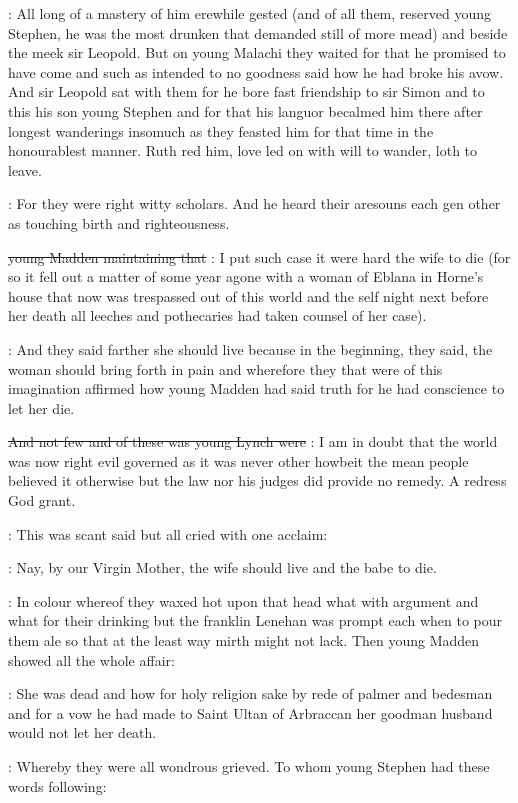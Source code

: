 \documentclass[12pt]{article}
\begin{document}
: All long of a mastery of him erewhile gested
(and of all them, reserved young Stephen, he was the most
drunken that demanded still of more mead) and beside the meek sir
Leopold. But on young Malachi they waited for that he promised to
have come and such as intended to no goodness said how he had broke
his avow. And sir Leopold sat with them for he bore fast friendship
to sir Simon and to this his son young Stephen and for that his languor
becalmed him there after longest wanderings insomuch as they feasted
him for that time in the honourablest manner. Ruth red him, love led
on with will to wander, loth to leave.


: For they were right witty scholars. And he heard their aresouns each
gen other as touching birth and righteousness.

\sout{young Madden maintaining that}
\Md: I put such case it were hard the wife to die (for so it fell out a
matter of some year agone with a woman of Eblana in Horne's house that
now was trespassed out of this world and the self night next before her
death all leeches and pothecaries had taken counsel of her case).

: And they said farther she should live because in the beginning, they
said, the woman should bring forth in pain and wherefore they that were of
this imagination affirmed how young Madden had said truth for he had
conscience to let her die.

\sout{And not few and of these was young Lynch were}
\Ly: I am in doubt that the world was now right evil governed as it was
never other howbeit the mean people believed it otherwise but the law nor
his judges did provide no remedy. A redress God grant.

: This was scant said but all cried with one acclaim:

\All: Nay, by our Virgin Mother, the wife should live
and the babe to die.

: In colour whereof they waxed hot upon that head what
with argument and what for their drinking but the franklin Lenehan was
prompt each when to pour them ale so that at the least way mirth might
not lack. Then young Madden showed all the whole affair:

\Md: She was dead and how for holy religion sake by rede of palmer and
bedesman and for a vow he had made to Saint Ultan of Arbraccan her
goodman husband would not let her death.

: Whereby they were all wondrous grieved.
To whom young Stephen had these words following:
\end{document}
